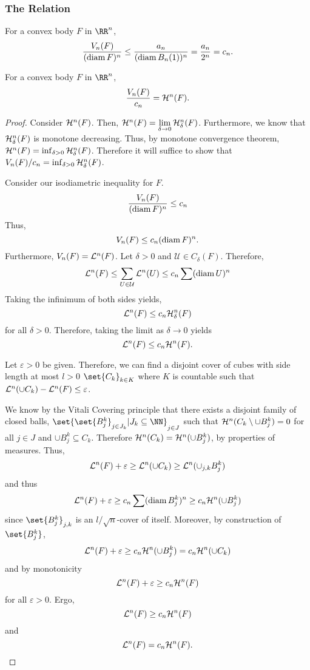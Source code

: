 \subsubsection{The Relation}

\begin{thm}
	For a convex body $F$ in $\RR^n$,
	\[
		\frac{V_n(F)}{(\operatorname{diam} F)^n} \leq \frac{a_n}{(\operatorname{diam} B_n(1))^n}=\frac{a_n}{2^n}=c_n.
	\]
\end{thm}

\begin{thm}
	For a convex body $F$ in $\RR^n$,
	\[
		\frac{V_n(F)}{c_n} = \mathcal{H}^n(F).
	\]
\end{thm}
\begin{proof}
	Consider $\mathcal{H}^n(F)$.
	Then, $\mathcal{H}^n (F) = \lim\limits_{\delta\rightarrow0} \mathcal{H}^n_\delta (F)$.
	Furthermore, we know that $\mathcal{H}^n_\delta(F)$ is monotone decreasing.
	Thus, by monotone convergence theorem, $\mathcal{H}^n(F)=\inf_{\delta>0} \mathcal{H}^n_\delta(F)$.
	Therefore it will suffice to show that $V_n(F)/c_n = \inf_{\delta>0} \mathcal{H}^n_\delta(F)$.

	Consider our isodiametric inequality for $F$.
	\[
		\frac{V_n(F)}{(\operatorname{diam} F)^n} \leq c_n
	\]
	Thus,
	\[
		V_n(F) \leq c_n(\operatorname{diam} F)^n.
	\]
	Furthermore, $V_n(F)=\mathcal{L}^n(F)$.
	Let $\delta>0$ and $\mathcal{U}\in C_\delta(F)$.
	Therefore,
	\[
		\mathcal{L}^n(F) \leq \sum_{U\in\mathcal{U}} \mathcal{L}^n(U) \leq c_n\sum (\operatorname{diam} U)^n
	\]
	Taking the infinimum of both sides yields,
	\[
		\mathcal{L}^n(F)\leq c_n\mathcal{H}^n_\delta(F)
	\]
	for all $\delta>0$.
	Therefore, taking the limit as $\delta\rightarrow0$ yields
	\[
		\mathcal{L}^n(F)\leq c_n\mathcal{H}^n(F).
	\]

	Let $\varepsilon>0$ be given.
	Therefore, we can find a disjoint cover of cubes with side length at most $l>0$ $\set{C_k}_{k\in K}$ where $K$ is countable such that $\mathcal{L}^n(\cup C_k) -\mathcal{L}^n(F) \leq \varepsilon$.

	We know by the Vitali Covering principle that there exists a disjoint family of closed balls, $\set{\set{B_j^k}_{j\in J_k} | J_k\subseteq\NN}_{j\in J}$ such that $\mathcal{H}^n(C_k\setminus \cup B_j^k)=0$ for all $j\in J$ and $\cup B_j^k \subseteq C_k$.
	Therefore $\mathcal{H}^n(C_k) = \mathcal{H}^n(\cup B_j^k)$, by properties of measures.
	Thus,
	\[
		\mathcal{L}^n(F) + \varepsilon \geq \mathcal{L}^n(\cup C_k) \geq \mathcal{L}^n(\cup_{j,k} B_j^k)
	\]
	and thus
	\[
		\mathcal{L}^n(F) + \varepsilon \geq c_n \sum (\operatorname{diam} B_j^k)^n\geq c_n\mathcal{H}^n(\cup B_j^k)
	\]
	since $\set{B_j^k}_{j,k}$ is an $l/\sqrt{n}$-cover of itself.
	Moreover, by construction of $\set{B_j^k}$,
	\[
		\mathcal{L}^n(F) + \varepsilon \geq c_n\mathcal{H}^n(\cup B_j^k)=c_n\mathcal{H}^n(\cup C_k)
	\]
	and by monotonicity
	\[
		\mathcal{L}^n(F) + \varepsilon \geq c_n \mathcal{H}^n(F)
	\]
	for all $\varepsilon > 0$.
	Ergo,
	\[
		\mathcal{L}^n(F) \geq  c_n\mathcal{H}^n(F)
	\]
	and
	\[
		\mathcal{L}^n(F) =  c_n\mathcal{H}^n(F).
	\]
\end{proof}

